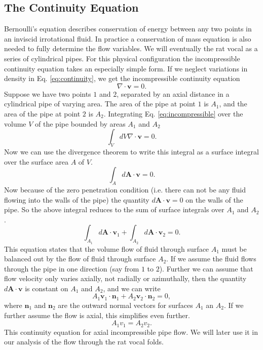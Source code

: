 \documentclass[12pt, letter]{report}
\begin{document}
\subsection{The Continuity Equation}
Bernoulli's equation describes conservation of energy between any two points in an inviscid irrotational fluid. In practice a conservation of mass equation is also needed to fully determine the flow variables. We will eventually the rat vocal as a series of cylindrical pipes. For this physical configuration the incompressible continuity equation takes an especially simple form. If we neglect variations in density in Eq. \ref{eq:continuity}, we get the incompressible continuity equation
\begin{equation} 
\label{eq:incompressible}
\nabla \cdot \textbf{v}=0.
\end{equation}
Suppose we have two points $1$ and $2$, separated by an axial distance in a cylindrical pipe of varying area. The area of the pipe at point $1$ is $A_1$, and the area of the pipe at point $2$ is $A_2$. Integrating Eq. \ref{eq:incompressible} over the volume $V$ of the pipe bounded by areas $A_1$ and $A_2$
\begin{equation} 
\int_V dV \nabla \cdot \textbf{v}=0.
\end{equation}
Now we can use the divergence theorem to write this integral as a surface integral over the surface area $A$ of $V$.
\begin{equation} 
\int_A d\textbf{A} \cdot \textbf{v}=0.
\end{equation}
Now because of the zero penetration condition (i.e. there can not be any fluid flowing into the walls of the pipe) the quantity $d\textbf{A} \cdot \textbf{v}=0$ on the walls of the pipe. So the above integral reduces to the sum of surface integrals over $A_1$ and $A_2$.
\begin{equation} 
\int_{A_1} d\textbf{A} \cdot \textbf{v}_1 + \int_{A_2} d\textbf{A} \cdot \textbf{v}_2=0.
\end{equation}
This equation states that the volume flow of fluid through surface $A_1$ must be balanced out by the flow of fluid through surface $A_2$. If we assume the fluid flows through the pipe in one direction (say from $1$ to $2$). Further we can assume that flow velocity only varies axially, not radially or azimuthally, then the quantity $d\textbf{A} \cdot \textbf{v}$ is constant on $A_1$ and $A_2$, and we can write
\begin{equation} 
A_1 \textbf{v}_1 \cdot \textbf{n}_1 + A_2 \textbf{v}_2 \cdot \textbf{n}_2 =0,
\end{equation}
where $\textbf{n}_1$ and $\textbf{n}_2$ are the outward normal vectors for surfaces $A_1$ an $A_2$. If we further assume the flow is axial, this simplifies even further.
\begin{equation}
A_1 v_1 = A_2 v_2.
\end{equation}
This continuity equation for axial incompressible pipe flow. We will later use it in our analysis of the flow through the rat vocal folds.


\end{document}
